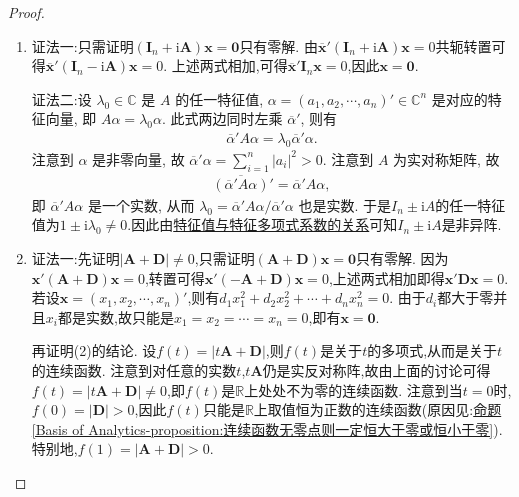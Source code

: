 \documentclass[../../main.tex]{subfiles}%
\begin{document}
\begin{proof}
\begin{enumerate}[(1)]
\item {\color{blue}证法一:}只需证明\((\boldsymbol{I}_n + \mathrm{i}\boldsymbol{A})\boldsymbol{x}=\boldsymbol{0}\)只有零解. 由\(\overline{\boldsymbol{x}}'(\boldsymbol{I}_n + \mathrm{i}\boldsymbol{A})\boldsymbol{x}=0\)共轭转置可得\(\overline{\boldsymbol{x}}'(\boldsymbol{I}_n - \mathrm{i}\boldsymbol{A})\boldsymbol{x}=0\). 上述两式相加,可得\(\overline{\boldsymbol{x}}'\boldsymbol{I}_n\boldsymbol{x}=0\),因此\(\boldsymbol{x}=\boldsymbol{0}\).

{\color{blue}证法二:}设 $\lambda_0 \in \mathbb{C}$ 是 $A$ 的任一特征值, $\alpha = (a_1, a_2, \cdots, a_n)' \in \mathbb{C}^n$ 是对应的特征向量, 即 $A\alpha = \lambda_0 \alpha$. 此式两边同时左乘 $\overline{\alpha }' $, 则有
\begin{align*}
\overline{\alpha }'  A \alpha = \lambda_0 \overline{\alpha }'  \alpha.
\end{align*}
注意到 $\alpha$ 是非零向量, 故 $\overline{\alpha }' \alpha = \sum_{i=1}^n |a_i|^2 > 0$. 注意到 $A$ 为实对称矩阵, 故
\begin{align*}
\overline{(\overline{\alpha }'  A\alpha )}' = \overline{\alpha }' A \alpha,
\end{align*}
即 $\overline{\alpha }'  A \alpha$ 是一个实数, 从而 $\lambda_0 = \overline{\alpha }'  A \alpha / \overline{\alpha }'  \alpha$ 也是实数. 于是$I_n\pm \mathrm{i}A$的任一特征值为$1\pm \mathrm{i}\lambda_0\ne 0$.因此由\hyperref[proposition:特征值与特征多项式系数的关系]{特征值与特征多项式系数的关系}可知$I_n\pm \mathrm{i}A$是非异阵.

\item {\color{blue}证法一:}先证明\(|\boldsymbol{A}+\boldsymbol{D}|\neq0\),只需证明\((\boldsymbol{A}+\boldsymbol{D})\boldsymbol{x}=\boldsymbol{0}\)只有零解. 因为\(\boldsymbol{x}'(\boldsymbol{A}+\boldsymbol{D})\boldsymbol{x}=0\),转置可得\(\boldsymbol{x}'(-\boldsymbol{A}+\boldsymbol{D})\boldsymbol{x}=0\),上述两式相加即得\(\boldsymbol{x}'\boldsymbol{D}\boldsymbol{x}=0\). 若设\(\boldsymbol{x}=(x_1,x_2,\cdots,x_n)'\),则有\(d_1x_1^2 + d_2x_2^2+\cdots + d_nx_n^2 = 0\). 由于\(d_i\)都大于零并且\(x_i\)都是实数,故只能是\(x_1 = x_2=\cdots = x_n = 0\),即有\(\boldsymbol{x}=\boldsymbol{0}\).

再证明(2)的结论. 设\(f(t)=|t\boldsymbol{A}+\boldsymbol{D}|\),则\(f(t)\)是关于\(t\)的多项式,从而是关于\(t\)的连续函数. 注意到对任意的实数\(t\),\(t\boldsymbol{A}\)仍是实反对称阵,故由上面的讨论可得\(f(t)=|t\boldsymbol{A}+\boldsymbol{D}|\neq0\),即\(f(t)\)是\(\mathbb{R}\)上处处不为零的连续函数. 注意到当\(t = 0\)时,\(f(0)=|\boldsymbol{D}|>0\),因此\(f(t)\)只能是\(\mathbb{R}\)上取值恒为正数的连续函数(原因见:\hyperref[Basis of Analytics-proposition:连续函数无零点则一定恒大于零或恒小于零]{命题\ref{Basis of Analytics-proposition:连续函数无零点则一定恒大于零或恒小于零}}).特别地,\(f(1)=|\boldsymbol{A}+\boldsymbol{D}|>0\). 


\end{enumerate}
\end{proof}
\end{document}
